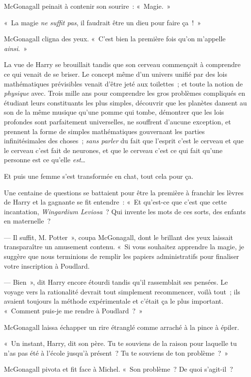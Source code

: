 McGonagall peinait à contenir son sourire~: «~Magie.~»

«~La magie \emph{ne suffit pas}, il faudrait être un dieu pour faire
ça~!~»

McGonagall cligna des yeux. «~C'est bien la première fois qu'on m'appelle \emph{ainsi}.~»

La vue de Harry se brouillait tandis que son cerveau commençait à comprendre ce qui venait de se briser. Le concept même d'un univers unifié par des lois mathématiques prévisibles venait d'être jeté aux toilettes~; et toute la notion de \emph{physique} avec. Trois mille ans pour comprendre les gros problèmes compliqués en étudiant leurs constituants les plus simples, découvrir que les planètes dansent au son de la même musique qu'une pomme qui tombe, démontrer que les lois profondes sont parfaitement universelles, ne souffrent d'aucune exception, et prennent la forme de simples mathématiques gouvernant les parties infinitésimales des choses~; \emph{sans parler} du fait que l'esprit c'est le cerveau et que le cerveau c'est fait de neurones, et que le cerveau c'est ce qui fait qu'une personne est ce qu'elle \emph{est}…

Et puis une femme s'est transformée en chat, tout cela pour ça.

Une centaine de questions se battaient pour être la première à franchir les lèvres de Harry et la gagnante se fit entendre~: «~Et qu'est-ce que c'est que cette incantation, \emph{Wingardium Leviosa}~? Qui invente les mots de ces sorts, des enfants en maternelle~?

--- Il suffit, M. Potter~», coupa McGonagall, dont le brillant des yeux laissait transparaître un amusement contenu. «~Si vous souhaitez apprendre la magie, je suggère que nous terminions de remplir les papiers administratifs pour finaliser votre inscription à Poudlard.

--- Bien~», dit Harry encore étourdi tandis qu'il rassemblait ses pensées. Le voyage vers la rationalité devrait tout simplement recommencer, voilà tout~; ils avaient toujours la méthode expérimentale et c'était ça le plus important. «~Comment puis-je me rendre à Poudlard~?~»

McGonagall laissa échapper un rire étranglé comme arraché à la pince à épiler.

«~Un instant, Harry, dit son père. Tu te souviens de la raison pour laquelle tu n'as pas été à l'école jusqu'à présent~? Tu te souviens de ton problème~?~»

McGonagall pivota et fit face à Michel. «~Son problème~? De quoi s'agit-il~?

